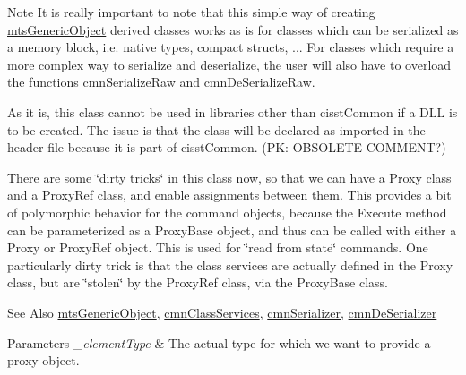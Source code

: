 \begin{DoxyNote}{Note}
It is really important to note that this simple way of creating \hyperlink{classmts_generic_object}{mts\-Generic\-Object} derived classes works as is for classes which can be serialized as a memory block, i.\-e. native types, compact structs, ... For classes which require a more complex way to serialize and deserialize, the user will also have to overload the functions cmn\-Serialize\-Raw and cmn\-De\-Serialize\-Raw.

As it is, this class cannot be used in libraries other than cisst\-Common if a D\-L\-L is to be created. The issue is that the class will be declared as imported in the header file because it is part of cisst\-Common. (P\-K\-: O\-B\-S\-O\-L\-E\-T\-E C\-O\-M\-M\-E\-N\-T?)

There are some \char`\"{}dirty tricks\char`\"{} in this class now, so that we can have a Proxy class and a Proxy\-Ref class, and enable assignments between them. This provides a bit of polymorphic behavior for the command objects, because the Execute method can be parameterized as a Proxy\-Base object, and thus can be called with either a Proxy or Proxy\-Ref object. This is used for \char`\"{}read from state\char`\"{} commands. One particularly dirty trick is that the class services are actually defined in the Proxy class, but are \char`\"{}stolen\char`\"{} by the Proxy\-Ref class, via the Proxy\-Base class.
\end{DoxyNote}
\begin{DoxySeeAlso}{See Also}
\hyperlink{classmts_generic_object}{mts\-Generic\-Object}, \hyperlink{classcmn_class_services}{cmn\-Class\-Services}, \hyperlink{classcmn_serializer}{cmn\-Serializer}, \hyperlink{classcmn_de_serializer}{cmn\-De\-Serializer}
\end{DoxySeeAlso}

\begin{DoxyParams}{Parameters}
{\em \-\_\-element\-Type} & The actual type for which we want to provide a proxy object. \\
\hline
\end{DoxyParams}


